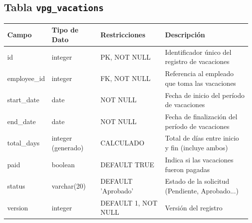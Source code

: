 \begin{center}
	\subsection{Tabla \texttt{vpg\_vacations}}
	\small
	\begin{tabular}{|l|l|l|p{6cm}|}
		\hline
		\textbf{Campo} & \textbf{Tipo de Dato} & \textbf{Restricciones} & \textbf{Descripción}                             \\
		\hline
		id             & integer               & PK, NOT NULL           & Identificador único del registro de vacaciones   \\
		employee\_id   & integer               & FK, NOT NULL           & Referencia al empleado que toma las vacaciones   \\
		start\_date    & date                  & NOT NULL               & Fecha de inicio del período de vacaciones        \\
		end\_date      & date                  & NOT NULL               & Fecha de finalización del período de vacaciones  \\
		total\_days    & integer (generado)    & CALCULADO              & Total de días entre inicio y fin (incluye ambos) \\
		paid           & boolean               & DEFAULT TRUE           & Indica si las vacaciones fueron pagadas          \\
		status         & varchar(20)           & DEFAULT 'Aprobado'     & Estado de la solicitud (Pendiente, Aprobado...)  \\
		version        & integer               & DEFAULT 1, NOT NULL    & Versión del registro                             \\
		\hline
	\end{tabular}
	\normalsize




\end{center}
